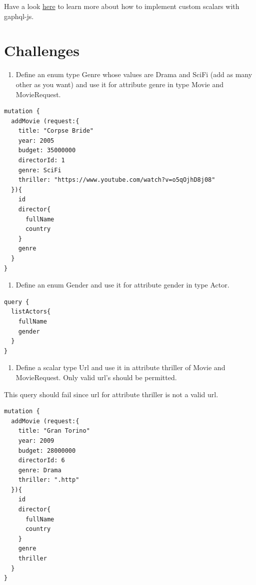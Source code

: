 \documentclass[]{book}
\providecommand{\tightlist}{%
  \setlength{\itemsep}{0pt}\setlength{\parskip}{0pt}}
\begin{document}
Have a look
\href{https://graphql.org/graphql-js/type/\#graphqlscalartype}{here} to
learn more about how to implement custom scalars with gaphql-js.

\section{Challenges}\label{challenges-1}

\begin{enumerate}
\def\labelenumi{\arabic{enumi}.}
\tightlist
\item
  Define an enum type Genre whose values are Drama and SciFi (add as
  many other as you want) and use it for attribute genre in type Movie
  and MovieRequest.
\end{enumerate}

\begin{verbatim}
mutation {
  addMovie (request:{
    title: "Corpse Bride"
    year: 2005
    budget: 35000000
    directorId: 1
    genre: SciFi
    thriller: "https://www.youtube.com/watch?v=o5qOjhD8j08"
  }){
    id
    director{
      fullName
      country
    }
    genre
  }
}
\end{verbatim}

\begin{enumerate}
\def\labelenumi{\arabic{enumi}.}
\setcounter{enumi}{1}
\tightlist
\item
  Define an enum Gender and use it for attribute gender in type Actor.
\end{enumerate}

\begin{verbatim}
query {
  listActors{
    fullName
    gender
  }
}
\end{verbatim}

\begin{enumerate}
\def\labelenumi{\arabic{enumi}.}
\setcounter{enumi}{2}
\tightlist
\item
  Define a scalar type Url and use it in attribute thriller of Movie and
  MovieRequest. Only valid url's should be permitted.
\end{enumerate}

This query should fail since url for attribute thriller is not a valid
url.

\begin{verbatim}
mutation {
  addMovie (request:{
    title: "Gran Torino"
    year: 2009
    budget: 28000000
    directorId: 6
    genre: Drama
    thriller: ".http"
  }){
    id
    director{
      fullName
      country
    }
    genre
    thriller
  }
}
\end{verbatim}
\end{document}
